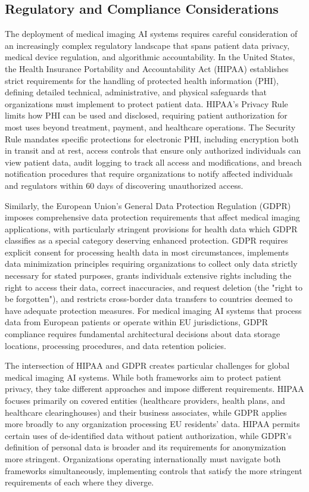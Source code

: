 \documentclass[12pt,a4paper]{article}
\begin{document}
\subsection{Regulatory and Compliance Considerations}

The deployment of medical imaging AI systems requires careful consideration of an increasingly complex regulatory landscape that spans patient data privacy, medical device regulation, and algorithmic accountability. In the United States, the Health Insurance Portability and Accountability Act (HIPAA) establishes strict requirements for the handling of protected health information (PHI), defining detailed technical, administrative, and physical safeguards that organizations must implement to protect patient data. HIPAA's Privacy Rule limits how PHI can be used and disclosed, requiring patient authorization for most uses beyond treatment, payment, and healthcare operations. The Security Rule mandates specific protections for electronic PHI, including encryption both in transit and at rest, access controls that ensure only authorized individuals can view patient data, audit logging to track all access and modifications, and breach notification procedures that require organizations to notify affected individuals and regulators within 60 days of discovering unauthorized access.

Similarly, the European Union's General Data Protection Regulation (GDPR) imposes comprehensive data protection requirements that affect medical imaging applications, with particularly stringent provisions for health data which GDPR classifies as a special category deserving enhanced protection. GDPR requires explicit consent for processing health data in most circumstances, implements data minimization principles requiring organizations to collect only data strictly necessary for stated purposes, grants individuals extensive rights including the right to access their data, correct inaccuracies, and request deletion (the "right to be forgotten"), and restricts cross-border data transfers to countries deemed to have adequate protection measures. For medical imaging AI systems that process data from European patients or operate within EU jurisdictions, GDPR compliance requires fundamental architectural decisions about data storage locations, processing procedures, and data retention policies.

The intersection of HIPAA and GDPR creates particular challenges for global medical imaging AI systems. While both frameworks aim to protect patient privacy, they take different approaches and impose different requirements. HIPAA focuses primarily on covered entities (healthcare providers, health plans, and healthcare clearinghouses) and their business associates, while GDPR applies more broadly to any organization processing EU residents' data. HIPAA permits certain uses of de-identified data without patient authorization, while GDPR's definition of personal data is broader and its requirements for anonymization more stringent. Organizations operating internationally must navigate both frameworks simultaneously, implementing controls that satisfy the more stringent requirements of each where they diverge.
\end{document}
